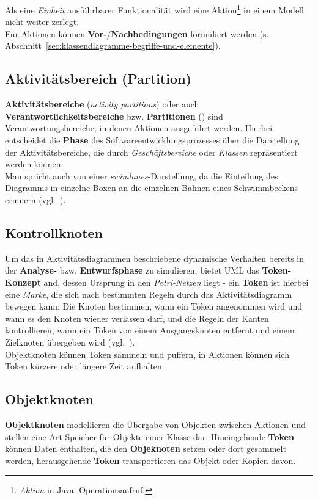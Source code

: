 \noindent
Als eine \textit{Einheit} ausführbarer Funktionalität wird eine Aktion\footnote{
\textit{Aktion} in Java: Operationsaufruf.
} in einem Modell nicht weiter zerlegt.\\
Für Aktionen können \textbf{Vor-}/\textbf{Nachbedingungen} formuliert werden (s. Abschnitt~\ref{sec:klassendiagramme-begriffe-und-elemente}).

\subsection{Aktivitätsbereich (Partition)}
\textbf{Aktivitätsbereiche} (\textit{activity partitions}) oder auch \textbf{Verantwortlichkeitsbereiche} bzw. \textbf{Partitionen} (\cite[76]{Bal05}) sind Verantwortungsbereiche, in denen Aktionen ausgeführt werden.
Hierbei entscheidet die \textbf{Phase} des Softwareentwicklungsprozesses über die Darstellung der Aktivitätsbereiche, die durch \textit{Geschäftsbereiche} oder \textit{Klassen} repräsentiert werden können.\\
Man spricht auch von einer \textit{swimlanes}-Darstellung, da die Einteilung des Diagramms in einzelne Boxen an die einzelnen Bahnen eines Schwimmbeckens erinnern (vgl.~\cite[76]{Bal05}).

\subsection{Kontrollknoten}
Um das in Aktivitätsdiagrammen beschriebene dynamische Verhalten bereits in der \textbf{Analyse-} bzw. \textbf{Entwurfsphase} zu simulieren, bietet UML das \textbf{Token-Konzept} and, dessen Ursprung in den \textit{Petri-Netzen} liegt - ein \textbf{Token} ist hierbei eine \textit{Marke}, die sich nach bestimmten Regeln durch das Aktivitätsdiagramm bewegen kann: Die Knoten bestimmen, wann ein Token angenommen wird und wann es den Knoten wieder verlassen darf, und die Regeln der Kanten kontrollieren, wann ein Token von einem Ausgangsknoten entfernt und einem Zielknoten übergeben wird (vgl.~\cite[323]{Bal05}).\\
Objektknoten können Token sammeln und puffern, in Aktionen können sich Token kürzere oder längere Zeit aufhalten.\\

\subsection{Objektknoten}


\textbf{Objektknoten} modellieren die Übergabe von Objekten zwischen Aktionen und stellen eine Art Speicher für Objekte einer Klasse dar: Hineingehende \textbf{Token} können Daten enthalten, die den \textbf{Objeknoten} setzen oder dort gesammelt werden, herausgehende \textbf{Token} transportieren das Objekt oder Kopien davon.\\

